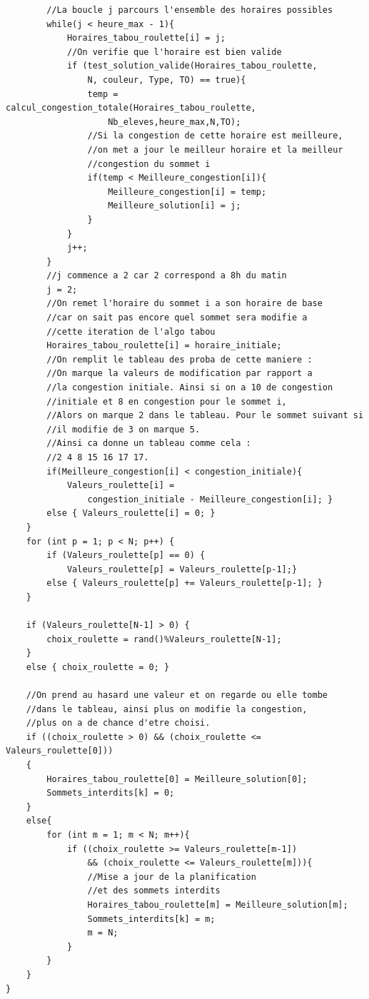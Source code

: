 \documentclass[a4paper,11pt]{article}
\begin{document}
\begin{lstlisting}
		//La boucle j parcours l'ensemble des horaires possibles
		while(j < heure_max - 1){
			Horaires_tabou_roulette[i] = j;
			//On verifie que l'horaire est bien valide
			if (test_solution_valide(Horaires_tabou_roulette, 
				N, couleur, Type, TO) == true){
				temp = calcul_congestion_totale(Horaires_tabou_roulette,
					Nb_eleves,heure_max,N,TO);
				//Si la congestion de cette horaire est meilleure, 
				//on met a jour le meilleur horaire et la meilleur 
				//congestion du sommet i
				if(temp < Meilleure_congestion[i]){
					Meilleure_congestion[i] = temp;
					Meilleure_solution[i] = j;
				}
			}
			j++;
		}
		//j commence a 2 car 2 correspond a 8h du matin 
		j = 2;
		//On remet l'horaire du sommet i a son horaire de base 
		//car on sait pas encore quel sommet sera modifie a 
		//cette iteration de l'algo tabou
		Horaires_tabou_roulette[i] = horaire_initiale;
		//On remplit le tableau des proba de cette maniere :
		//On marque la valeurs de modification par rapport a 
		//la congestion initiale. Ainsi si on a 10 de congestion 
		//initiale et 8 en congestion pour le sommet i,
		//Alors on marque 2 dans le tableau. Pour le sommet suivant si 
		//il modifie de 3 on marque 5. 
		//Ainsi ca donne un tableau comme cela : 
		//2 4 8 15 16 17 17.
		if(Meilleure_congestion[i] < congestion_initiale){ 
			Valeurs_roulette[i] = 
				congestion_initiale - Meilleure_congestion[i]; }
		else { Valeurs_roulette[i] = 0; }
	}
	for (int p = 1; p < N; p++) { 
		if (Valeurs_roulette[p] == 0) { 
			Valeurs_roulette[p] = Valeurs_roulette[p-1];} 
		else { Valeurs_roulette[p] += Valeurs_roulette[p-1]; }
	}
		
	if (Valeurs_roulette[N-1] > 0) {
		choix_roulette = rand()%Valeurs_roulette[N-1];
	}
	else { choix_roulette = 0; }

	//On prend au hasard une valeur et on regarde ou elle tombe 
	//dans le tableau, ainsi plus on modifie la congestion, 
	//plus on a de chance d'etre choisi.
	if ((choix_roulette > 0) && (choix_roulette <= Valeurs_roulette[0]))
	{
		Horaires_tabou_roulette[0] = Meilleure_solution[0];
		Sommets_interdits[k] = 0;
	}
	else{
		for (int m = 1; m < N; m++){
			if ((choix_roulette >= Valeurs_roulette[m-1]) 
				&& (choix_roulette <= Valeurs_roulette[m])){
				//Mise a jour de la planification 
				//et des sommets interdits
				Horaires_tabou_roulette[m] = Meilleure_solution[m];
				Sommets_interdits[k] = m;
				m = N;
			}
		}
	}
}
\end{lstlisting}
\end{document}
